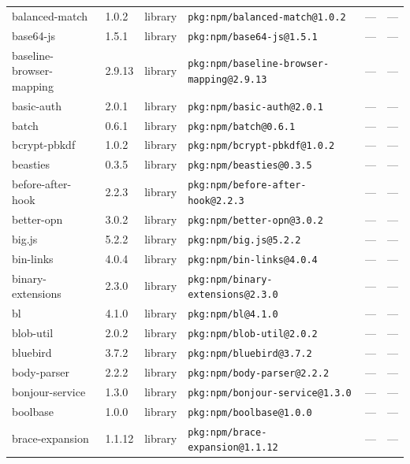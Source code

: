 \documentclass[11pt,a4paper]{article}
\begin{document}
\begin{longtable}{|p{4cm}|p{2cm}|p{1.6cm}|p{5cm}|p{1.5cm}|p{3.5cm}|}
\raggedright balanced-match & 1.0.2 & library & \small\texttt{pkg:npm/balanced-match@1.0.2} & — & \small — \\
\raggedright base64-js & 1.5.1 & library & \small\texttt{pkg:npm/base64-js@1.5.1} & — & \small — \\
\raggedright baseline-browser-mapping & 2.9.13 & library & \small\texttt{pkg:npm/baseline-browser-mapping@2.9.13} & — & \small — \\
\raggedright basic-auth & 2.0.1 & library & \small\texttt{pkg:npm/basic-auth@2.0.1} & — & \small — \\
\raggedright batch & 0.6.1 & library & \small\texttt{pkg:npm/batch@0.6.1} & — & \small — \\
\raggedright bcrypt-pbkdf & 1.0.2 & library & \small\texttt{pkg:npm/bcrypt-pbkdf@1.0.2} & — & \small — \\
\raggedright beasties & 0.3.5 & library & \small\texttt{pkg:npm/beasties@0.3.5} & — & \small — \\
\raggedright before-after-hook & 2.2.3 & library & \small\texttt{pkg:npm/before-after-hook@2.2.3} & — & \small — \\
\raggedright better-opn & 3.0.2 & library & \small\texttt{pkg:npm/better-opn@3.0.2} & — & \small — \\
\raggedright big.js & 5.2.2 & library & \small\texttt{pkg:npm/big.js@5.2.2} & — & \small — \\
\raggedright bin-links & 4.0.4 & library & \small\texttt{pkg:npm/bin-links@4.0.4} & — & \small — \\
\raggedright binary-extensions & 2.3.0 & library & \small\texttt{pkg:npm/binary-extensions@2.3.0} & — & \small — \\
\raggedright bl & 4.1.0 & library & \small\texttt{pkg:npm/bl@4.1.0} & — & \small — \\
\raggedright blob-util & 2.0.2 & library & \small\texttt{pkg:npm/blob-util@2.0.2} & — & \small — \\
\raggedright bluebird & 3.7.2 & library & \small\texttt{pkg:npm/bluebird@3.7.2} & — & \small — \\
\raggedright body-parser & 2.2.2 & library & \small\texttt{pkg:npm/body-parser@2.2.2} & — & \small — \\
\raggedright bonjour-service & 1.3.0 & library & \small\texttt{pkg:npm/bonjour-service@1.3.0} & — & \small — \\
\raggedright boolbase & 1.0.0 & library & \small\texttt{pkg:npm/boolbase@1.0.0} & — & \small — \\
\raggedright brace-expansion & 1.1.12 & library & \small\texttt{pkg:npm/brace-expansion@1.1.12} & — & \small — \\

\end{longtable}
\end{document}
